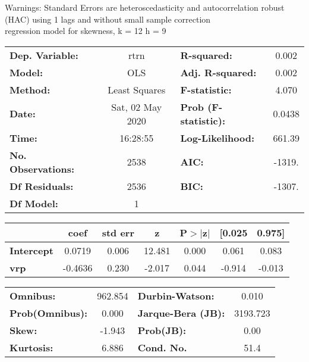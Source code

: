 Warnings: \newline
 [1] Standard Errors are heteroscedasticity and autocorrelation robust (HAC) using 1 lags and without small sample correction\\ 

regression model for skewness, k = 12 h = 9\begin{center}
\begin{tabular}{lclc}
\toprule
\textbf{Dep. Variable:}    &       rtrn       & \textbf{  R-squared:         } &     0.002   \\
\textbf{Model:}            &       OLS        & \textbf{  Adj. R-squared:    } &     0.002   \\
\textbf{Method:}           &  Least Squares   & \textbf{  F-statistic:       } &     4.070   \\
\textbf{Date:}             & Sat, 02 May 2020 & \textbf{  Prob (F-statistic):} &   0.0438    \\
\textbf{Time:}             &     16:28:55     & \textbf{  Log-Likelihood:    } &    661.39   \\
\textbf{No. Observations:} &        2538      & \textbf{  AIC:               } &    -1319.   \\
\textbf{Df Residuals:}     &        2536      & \textbf{  BIC:               } &    -1307.   \\
\textbf{Df Model:}         &           1      & \textbf{                     } &             \\
\bottomrule
\end{tabular}
\begin{tabular}{lcccccc}
                   & \textbf{coef} & \textbf{std err} & \textbf{z} & \textbf{P$> |$z$|$} & \textbf{[0.025} & \textbf{0.975]}  \\
\midrule
\textbf{Intercept} &       0.0719  &        0.006     &    12.481  &         0.000        &        0.061    &        0.083     \\
\textbf{vrp}       &      -0.4636  &        0.230     &    -2.017  &         0.044        &       -0.914    &       -0.013     \\
\bottomrule
\end{tabular}
\begin{tabular}{lclc}
\textbf{Omnibus:}       & 962.854 & \textbf{  Durbin-Watson:     } &    0.010  \\
\textbf{Prob(Omnibus):} &   0.000 & \textbf{  Jarque-Bera (JB):  } & 3193.723  \\
\textbf{Skew:}          &  -1.943 & \textbf{  Prob(JB):          } &     0.00  \\
\textbf{Kurtosis:}      &   6.886 & \textbf{  Cond. No.          } &     51.4  \\
\bottomrule
\end{tabular}
\end{center}

